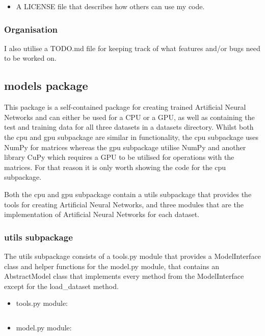 \documentclass[./project-report/src/latex/project-report.tex]{subfiles}
\begin{document}
\begin{itemize}
\begin{itemize}
\begin{figure}[h!]
                \end{figure}
        \end{itemize}
    \item A LICENSE file that describes how others can use my code.
\end{itemize}

\subsubsection{Organisation}

I also utilise a TODO.md file for keeping track of what features and/or bugs need to be worked on.

\subsection{models package}

This package is a self-contained package for creating trained Artificial Neural Networks and can either be used for a CPU or a GPU, as well as containing the test 
and training data for all three datasets in a datasets directory. Whilst both the cpu and gpu subpackage are similar in functionality, the cpu subpackage uses NumPy 
for matrices whereas the gpu subpackage utilise NumPy and another library CuPy which requires a GPU to be utilised for operations with the matrices. For that reason 
it is only worth showing the code for the cpu subpackage.

Both the cpu and gpu subpackage contain a utils subpackage that provides the tools for creating Artificial Neural Networks, and three modules that are the implementation 
of Artificial Neural Networks for each dataset.

\subsubsection{utils subpackage}

The utils subpackage consists of a tools.py module that provides a ModelInterface class and helper functions for the model.py module, that contains an AbstractModel 
class that implements every method from the ModelInterface except for the load\_dataset method.

\begin{itemize}
    \item tools.py module:
        \inputminted{python}{./school_project/models/cpu/utils/tools.py}
    \item model.py module:
        \inputminted{python}{./school_project/models/cpu/utils/model.py}
\end{itemize}
\end{document}
